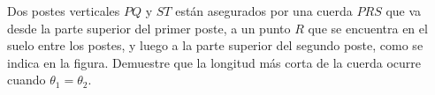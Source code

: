 \item Dos postes verticales $PQ$ y $ST$ están asegurados por una cuerda $PRS$ que va desde la parte superior del primer poste, a un punto $R$ que se encuentra en el suelo entre los postes, y luego a la parte superior del segundo poste, como se indica en la figura. Demuestre que la longitud más corta de la cuerda ocurre cuando $\theta_1 = \theta_2$.
\begin{center}
\end{center}
